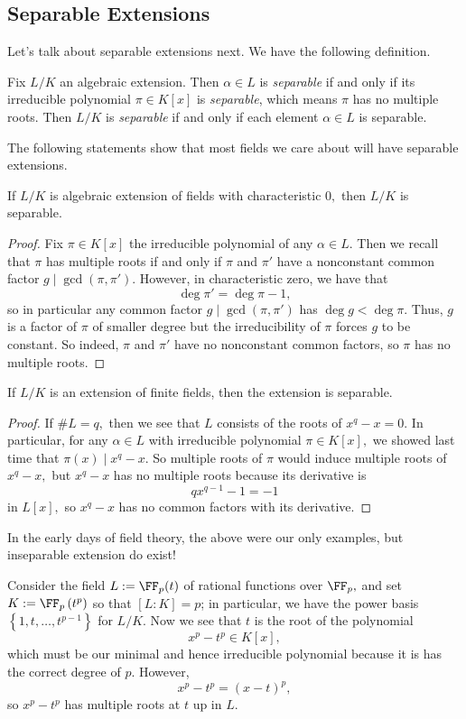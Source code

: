 \subsection{Separable Extensions}
Let's talk about separable extensions next. We have the following definition.
\begin{definition}[Separable]
	Fix $L/K$ an algebraic extension. Then $\alpha\in L$ is \textit{separable} if and only if its irreducible polynomial $\pi\in K[x]$ is \textit{separable}, which means $\pi$ has no multiple roots. Then $L/K$ is \textit{separable} if and only if each element $\alpha\in L$ is separable.
\end{definition}
The following statements show that most fields we care about will have separable extensions.
\begin{exe}
	If $L/K$ is algebraic extension of fields with characteristic $0,$ then $L/K$ is separable.
\end{exe}
\begin{proof}
	Fix $\pi\in K[x]$ the irreducible polynomial of any $\alpha\in L.$ Then we recall that $\pi$ has multiple roots if and only if $\pi$ and $\pi'$ have a nonconstant common factor $g\mid\gcd(\pi,\pi').$ However, in characteristic zero, we have that
	\[\deg\pi'=\deg\pi-1,\]
	so in particular any common factor $g\mid\gcd(\pi,\pi')$ has $\deg g<\deg\pi.$ Thus, $g$ is a factor of $\pi$ of smaller degree but the irreducibility of $\pi$ forces $g$ to be constant. So indeed, $\pi$ and $\pi'$ have no nonconstant common factors, so $\pi$ has no multiple roots.
\end{proof}
\begin{exe}
	If $L/K$ is an extension of finite fields, then the extension is separable.
\end{exe}
\begin{proof}
	If $\#L=q,$ then we see that $L$ consists of the roots of $x^q-x=0.$ In particular, for any $\alpha\in L$ with irreducible polynomial $\pi\in K[x],$ we showed last time that $\pi(x)\mid x^q-x.$ So multiple roots of $\pi$ would induce multiple roots of $x^q-x,$ but $x^q-x$ has no multiple roots because its derivative is
	\[qx^{q-1}-1=-1\]
	in $L[x],$ so $x^q-x$ has no common factors with its derivative.
\end{proof}
In the early days of field theory, the above were our only examples, but inseparable extension do exist!
\begin{nex}
	Consider the field $L:=\FF_p(t)$ of rational functions over $\FF_p,$ and set $K:=\FF_p\left(t^p\right)$ so that $[L:K]=p$; in particular, we have the power basis $\left\{1,t,\ldots,t^{p-1}\right\}$ for $L/K.$ Now we see that $t$ is the root of the polynomial
	\[x^p-t^p\in K[x],\]
	which must be our minimal and hence irreducible polynomial because it is has the correct degree of $p.$ However,
	\[x^p-t^p=(x-t)^p,\]
	so $x^p-t^p$ has multiple roots at $t$ up in $L.$
\end{nex}
